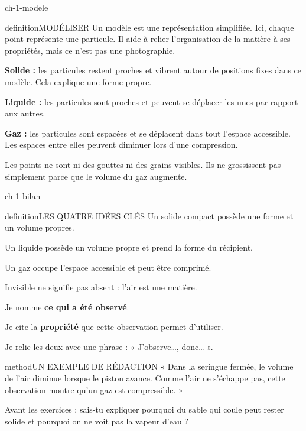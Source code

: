 \documentclass[12pt,twoside,openany]{book}
\begin{document}
\label{ch-1-modele}
\begin{pcFiche}{ch-1-modele}
\begin{pcEncadre}{definition}{MODÉLISER}
Un modèle est une représentation simplifiée. Ici, chaque point représente une particule. Il aide à relier l’organisation de la matière à ses propriétés, mais ce n’est pas une photographie.\par
\end{pcEncadre}
\begin{questions}
\item \textbf{Solide :} les particules restent proches et vibrent autour de positions fixes dans ce modèle. Cela explique une forme propre.
\item \textbf{Liquide :} les particules sont proches et peuvent se déplacer les unes par rapport aux autres.
\item \textbf{Gaz :} les particules sont espacées et se déplacent dans tout l’espace accessible. Les espaces entre elles peuvent diminuer lors d’une compression.
\end{questions}
Les points ne sont ni des gouttes ni des grains visibles. Ils ne grossissent pas simplement parce que le volume du gaz augmente.\par
\end{pcFiche}
\label{ch-1-bilan}
\begin{pcFiche}{ch-1-bilan}
\begin{pcEncadre}{definition}{LES QUATRE IDÉES CLÉS}
Un solide compact possède une forme et un volume propres.\par Un liquide possède un volume propre et prend la forme du récipient.\par Un gaz occupe l’espace accessible et peut être comprimé.\par Invisible ne signifie pas absent : l’air est une matière.\par
\end{pcEncadre}
\begin{questions}
\item Je nomme \textbf{ce qui a été observé}.
\item Je cite la \textbf{propriété} que cette observation permet d’utiliser.
\item Je relie les deux avec une phrase : « J’observe…, donc… ».
\end{questions}
\begin{pcEncadre}{method}{UN EXEMPLE DE RÉDACTION}
« Dans la seringue fermée, le volume de l’air diminue lorsque le piston avance. Comme l’air ne s’échappe pas, cette observation montre qu’un gaz est compressible. »\par
\end{pcEncadre}
Avant les exercices : sais-tu expliquer pourquoi du sable qui coule peut rester solide et pourquoi on ne voit pas la vapeur d’eau ?\par
\end{pcFiche}
\end{document}
